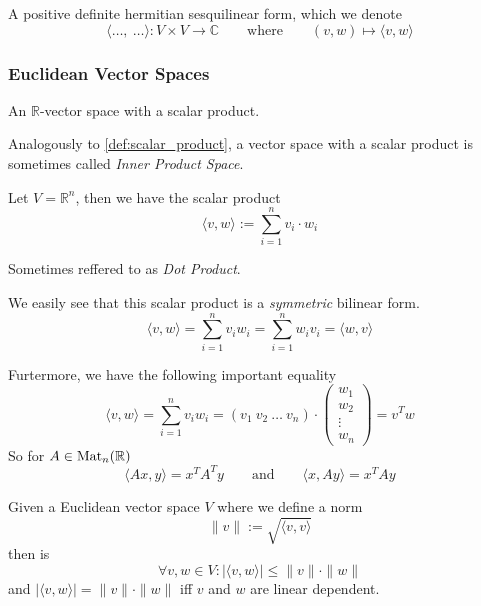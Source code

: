 \begin{definition}
   A positive definite hermitian sesquilinear form, which we denote
   \[\langle \ldots,~ \ldots\rangle: V \times V \to \mathbb{C} \qquad\text{where}\qquad (v, w) \mapsto \langle v, w\rangle\]
\end{definition}

\subsubsection{Euclidean Vector Spaces}
\begin{definition}
   An \(\mathbb{R}\)-vector space with a scalar product.
\end{definition}
\begin{remark}
   Analogously to \cref{def:scalar_product}, a vector space with a scalar product is sometimes called \emph{Inner Product Space}.
\end{remark}

\begin{definition}\label{def:std_scal_prod}
   Let \(V = \mathbb{R}^n\), then we have the scalar product
   \[\langle v, w \rangle := \sum_{i=1}^n v_i \cdot w_i\]
\end{definition}
\begin{remark}
   Sometimes reffered to as \emph{Dot Product}.
\end{remark}
\begin{remark}
   We easily see that this scalar product is a \emph{symmetric} bilinear form.
   \[\langle v, w \rangle = \sum_{i=1}^n v_iw_i = \sum_{i=1}^n w_iv_i = \langle w, v\rangle\]
\end{remark}
\begin{remark}
   Furtermore, we have the following important equality
   \[\langle v, w \rangle = \sum_{i=1}^n v_i w_i = (v_1~v_2~\ldots~v_n)\cdot \begin{pmatrix}w_1\\w_2\\\vdots\\w_n\end{pmatrix} = v^T w\]
   So for \(A \in \operatorname{Mat}_n(\mathbb{R})\)
   \[\langle Ax, y\rangle = x^TA^Ty \qquad\text{and}\qquad \langle x, Ay\rangle = x^TAy\]
\end{remark}

\begin{proposition}\label{pro:cauchy_schwarz}
   Given a Euclidean vector space \(V\) where we define a norm
   \[\|v\| := \sqrt{\langle v, v\rangle}\]
   then is
   \[\forall v, w \in V: |\langle v, w\rangle| \leq \|v\| \cdot \|w\|\]
   and \(|\langle v, w\rangle| = \|v\| \cdot \|w\|\) iff \(v\) and \(w\) are linear dependent.
\end{proposition}

